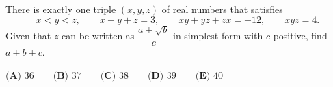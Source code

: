 There is exactly one triple $(x,y,z)$ of real numbers that satisfies
\[x<y<z,\qquad x+y+z=3,\qquad xy+yz+zx=-12,\qquad xyz=4 .\]
Given that $z$ can be written as $\dfrac{a+\sqrt b}{c}$ in simplest form with $c$ positive, find $a+b+c$.

$\textbf{(A) } 36 \qquad \textbf{(B) } 37 \qquad \textbf{(C) } 38 \qquad \textbf{(D) } 39 \qquad \textbf{(E) } 40$
